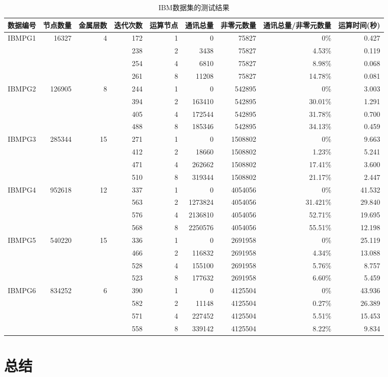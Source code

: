 \begin{sidewaystable}[htbp]
\centering
\caption{IBM数据集的测试结果}
\label{tab:tabibmresult}
\begin{tabular}{c|r|r|r|r|r|r|r|r}
\toprule[1.5pt]
\hline
数据编号 & 节点数量 & 金属层数 & 迭代次数 & 运算节点 & 通讯总量 & 非零元数量 & 通讯总量/非零元数量 & 运算时间(秒)  \\
\hline
IBMPG1 & 16327 & 4  & 172  & 1  &  0 & 75827 & 0\% & 0.427\\
\hline
& & & 238 & 2 & 3438 & 75827 & 4.53\% & 0.119 \\
\hline
& & & 254 & 4 & 6810 & 75827 &  8.98\% &  0.068 \\
\hline
& & & 261 & 8 & 11208 & 75827 & 14.78\% & 0.081 \\
\hline
IBMPG2 & 126905 & 8 & 244 & 1 & 0 & 542895 & 0\% & 3.003 \\
\hline
& & & 394 & 2 & 163410 & 542895 & 30.01\% & 1.291 \\
\hline
& & & 405 & 4 & 172544 & 542895 & 31.78\% &  0.700 \\
\hline
& & & 488 & 8 & 185346 & 542895 & 34.13\% & 0.459 \\
\hline
IBMPG3 & 285344 & 15 & 271 & 1 & 0 & 1508802 & 0\% & 9.663 \\
\hline
& & & 412 & 2 & 18660 & 1508802 & 1.23\% & 5.241 \\
\hline
& & & 471 & 4 & 262662 & 1508802 & 17.41\% & 3.600 \\
\hline
& & & 510 & 8 & 319344 & 1508802 & 21.17\% & 2.447 \\
\hline
IBMPG4 & 952618 & 12 & 337 & 1 & 0 & 4054056 & 0\% & 41.532 \\
\hline
& & & 563 & 2 & 1273824 & 4054056 & 31.421\% & 29.840 \\
\hline
& & & 576 & 4 & 2136810 & 4054056 & 52.71\% & 19.695 \\
\hline
& & & 568 & 8 & 2250576 & 4054056 & 55.51\% & 12.198 \\
\hline
IBMPG5 & 540220 & 15 & 336 & 1 & 0 & 2691958 & 0\% & 25.119 \\
\hline
& & & 466 & 2 & 116832 & 2691958 & 4.34\% & 13.088 \\
\hline
& & & 528 & 4 & 155100 & 2691958 & 5.76\% & 8.757 \\
\hline
& & & 523 & 8 & 177632 & 2691958 & 6.60\% & 5.459 \\
\hline
IBMPG6 & 834252 & 6 & 390 & 1 & 0 & 4125504 & 0\% & 43.936 \\
\hline
& & & 582 & 2 & 11148 & 4125504 & 0.27\% & 26.389 \\
\hline
& & & 571 & 4 & 227452 & 4125504 & 5.51\% & 15.453 \\
\hline
& & & 558 & 8 & 339142 & 4125504 & 8.22\% & 9.834 \\
\hline
\end{tabular}
\end{sidewaystable}

\section{总结}
